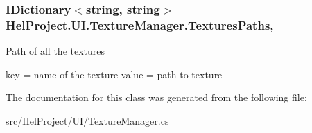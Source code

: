 \subsubsection[{Textures\+Paths}]{\setlength{\rightskip}{0pt plus 5cm}I\+Dictionary$<$string, string$>$ Hel\+Project.\+U\+I.\+Texture\+Manager.\+Textures\+Paths\hspace{0.3cm}{\ttfamily [get]}, {\ttfamily [set]}}\label{class_hel_project_1_1_u_i_1_1_texture_manager_a0524c77f2c5fd5c6f3eb57645bf8a521}


Path of all the textures 

key = name of the texture value = path to texture 

The documentation for this class was generated from the following file\+:\begin{DoxyCompactItemize}
\item 
src/\+Hel\+Project/\+U\+I/Texture\+Manager.\+cs\end{DoxyCompactItemize}
